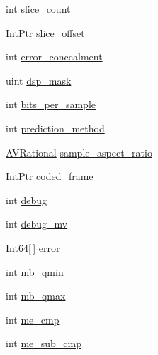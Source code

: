 \begin{DoxyCompactItemize}
int \hyperlink{struct_tao_1_1_f_fmpeg_1_1_f_fmpeg_1_1_a_v_codec_context_a2214c793b01d7799ed2e3e93f271c83f}{slice\_\-count}
\item 
IntPtr \hyperlink{struct_tao_1_1_f_fmpeg_1_1_f_fmpeg_1_1_a_v_codec_context_a4061bba691eaeb74e41b45586118a004}{slice\_\-offset}
\item 
int \hyperlink{struct_tao_1_1_f_fmpeg_1_1_f_fmpeg_1_1_a_v_codec_context_a5d439f7082720e2d24dcb5de48b881c4}{error\_\-concealment}
\item 
uint \hyperlink{struct_tao_1_1_f_fmpeg_1_1_f_fmpeg_1_1_a_v_codec_context_a35784a9d04118f782d334ae0e1f53f52}{dsp\_\-mask}
\item 
int \hyperlink{struct_tao_1_1_f_fmpeg_1_1_f_fmpeg_1_1_a_v_codec_context_a454b690eac52e8344e0001a10657ba56}{bits\_\-per\_\-sample}
\item 
int \hyperlink{struct_tao_1_1_f_fmpeg_1_1_f_fmpeg_1_1_a_v_codec_context_a40fb9763ea05edec432dcac84c3cb6a1}{prediction\_\-method}
\item 
\hyperlink{struct_tao_1_1_f_fmpeg_1_1_f_fmpeg_1_1_a_v_rational}{AVRational} \hyperlink{struct_tao_1_1_f_fmpeg_1_1_f_fmpeg_1_1_a_v_codec_context_a8555ab1c3522cac34fd93871cb308fa9}{sample\_\-aspect\_\-ratio}
\item 
IntPtr \hyperlink{struct_tao_1_1_f_fmpeg_1_1_f_fmpeg_1_1_a_v_codec_context_af95abb0c53f761a8f59e43ac222aa270}{coded\_\-frame}
\item 
int \hyperlink{struct_tao_1_1_f_fmpeg_1_1_f_fmpeg_1_1_a_v_codec_context_a208361fed669cdcef53b7d362f927360}{debug}
\item 
int \hyperlink{struct_tao_1_1_f_fmpeg_1_1_f_fmpeg_1_1_a_v_codec_context_ae213d6275d67691d92a6b2e8016eb9b1}{debug\_\-mv}
\item 
Int64\mbox{[}$\,$\mbox{]} \hyperlink{struct_tao_1_1_f_fmpeg_1_1_f_fmpeg_1_1_a_v_codec_context_aa3fbda308154efa502df56f82d171a35}{error}
\item 
int \hyperlink{struct_tao_1_1_f_fmpeg_1_1_f_fmpeg_1_1_a_v_codec_context_a6aa57db811857a4197ff4cc428aae2ec}{mb\_\-qmin}
\item 
int \hyperlink{struct_tao_1_1_f_fmpeg_1_1_f_fmpeg_1_1_a_v_codec_context_a5c1e7dbf1459fb72b8dabf983cf4c27a}{mb\_\-qmax}
\item 
int \hyperlink{struct_tao_1_1_f_fmpeg_1_1_f_fmpeg_1_1_a_v_codec_context_ad36b794e852703767cd3faf5284788d5}{me\_\-cmp}
\item 
int \hyperlink{struct_tao_1_1_f_fmpeg_1_1_f_fmpeg_1_1_a_v_codec_context_ad46dba74d772967ebe85d77720284876}{me\_\-sub\_\-cmp}

\end{DoxyCompactItemize}

